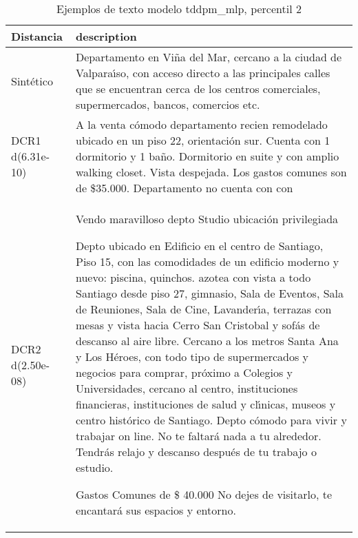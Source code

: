 \begin{table}[H]
\centering
\fontsize{10}{14}\selectfont
\caption{Ejemplos de texto modelo tddpm\_mlp, percentil 2}
\label{table-example-economicos-a-1-tddpm_mlp-2p-text}
\begin{tabular}{|l|m{35em}|}
\hline
\rowcolor[gray]{0.8}
Distancia & description \\
\hline Sintético & Departamento en Vi\~na del Mar, cercano a la ciudad de Valpara{\'\i}so, con acceso directo a las principales calles que se encuentran cerca de los centros comerciales, supermercados, bancos, comercios etc. \\
\hline DCR1 d(6.31e-10) & A la venta c\'omodo departamento recien remodelado ubicado en un piso 22, orientaci\'on sur. Cuenta con 1 dormitorio y 1 ba\~no. Dormitorio en suite y con amplio walking closet. Vista despejada. Los gastos comunes son de \$35.000. Departamento no cuenta con con \\
\hline DCR2 d(2.50e-08) & Vendo maravilloso depto Studio ubicaci\'on privilegiada

Depto ubicado en Edificio en el centro de Santiago, Piso 15, con las  comodidades de un edificio moderno y nuevo:  piscina,  quinchos.  azotea  con  vista  a todo Santiago  desde piso 27, gimnasio,  Sala de Eventos,  Sala de Reuniones,  Sala  de Cine, Lavander{\'\i}a,  terrazas con mesas  y vista  hacia  Cerro San Cristobal y  sof\'as de descanso al aire libre.
Cercano a los metros  Santa Ana y  Los H\'eroes,  con  todo tipo  de supermercados y negocios  para comprar,  pr\'oximo a  Colegios y Universidades,  cercano  al centro,  instituciones financieras,  instituciones de salud y cl{\'\i}nicas,  museos  y  centro hist\'orico de Santiago.
Depto c\'omodo  para  vivir y trabajar on line.
No te faltar\'a nada a tu alrededor.
Tendr\'as  relajo y descanso  despu\'es  de tu trabajo o estudio. 

Gastos Comunes  de  \$ 40.000 
No dejes de visitarlo,  te encantar\'a sus espacios y entorno. \\
\hline
\end{tabular}
\end{table}
